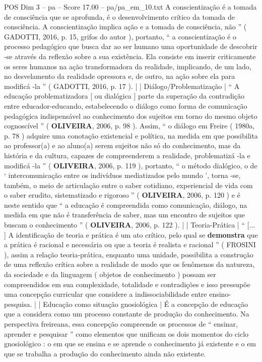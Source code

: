 \begin{textsample}{POS Dim 3 – pa – Score 17.00 – pa/pa\_em\_10.txt}
A conscientização é a tomada de consciência que se aprofunda, é o desenvolvimento crítico da tomada de consciência.
A conscientização implica ação e a tomada de consciência, não ” ( GADOTTI, 2016, p. 15, grifos do autor ), portanto, “ a conscientização é o processo pedagógico que busca dar ao ser humano uma oportunidade de descobrir -se através da reflexão sobre a sua existência.
Ela consiste em inserir criticamente os seres humanos na ação transformadora da realidade, implicando, de um lado, no desvelamento da realidade opressora e, de outro, na ação sobre ela para modificá -la ” ( GADOTTI, 2016, p. 17 ). | | Diálogo/Problematização | “ A educação problematizadora [ ou dialógica ] parte da superação da contradição entre educador-educando, estabelecendo o diálogo como forma de comunicação pedagógica indispensável ao conhecimento dos sujeitos em torno do mesmo objeto cognoscível ” ( \textbf{OLIVEIRA}, 2006, p. 98 ).
Assim, “ o diálogo em Freire ( 1980a, p. 78 ) adquire uma conotação existencial e política, na medida em que possibilita ao professor(a) e ao aluno(a) serem sujeitos não só do conhecimento, mas da história e da cultura, capazes de compreenderem a realidade, problematizá -la e modificá -la ” ( \textbf{OLIVEIRA}, 2006, p. 119 ), portanto, “ o método dialógico, o de ‘ intercomunicação entre os indivíduos mediatizados pelo mundo ’, torna -se, também, o meio de articulação entre o saber cotidiano, experiencial de vida com o saber erudito, sistematizado e rigoroso ” ( \textbf{OLIVEIRA}, 2006, p. 120 ) e é neste sentido que “ a educação é compreendida como comunicação, diálogo, na medida em que não é transferência de saber, mas um encontro de sujeitos que buscam o conhecimento ” ( \textbf{OLIVEIRA}, 2006, p. 122 ). | | Teoria-Prática | “ [... ] A identificação de teoria e prática é um ato crítico, pelo qual se \textbf{demonstra} que a prática é racional e necessária ou que a teoria é realista e racional ” ( FROSINI ), assim a relação teoria-prática, enquanto uma unidade, possibilita a construção de uma reflexão crítica sobre a realidade de modo que os fenômenos da natureza, da sociedade e da linguagem ( objetos de conhecimento ) possam ser compreendidos em sua complexidade, totalidade e contradições e isso pressupõe uma concepção curricular que considere a indissociabilidade entre ensino-pesquisa. | | Educação como situação gnosiológica | É a concepção de educação que a considera como um processo constante de produção do conhecimento.
Na perspectiva freireana, essa concepção compreende os processos de “ ensinar, aprender e pesquisar ” como elementos que unificam os dois momentos do ciclo gnosiológico : o em que se ensina e se aprende o conhecimento já existente e o em que se trabalha a produção do conhecimento ainda não existente.

\end{textsample}
